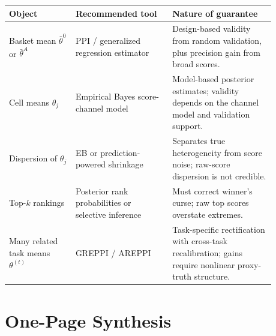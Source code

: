 \documentclass[11pt]{article}
\begin{document}
\begin{center}
\begin{tabular}{>{\raggedright\arraybackslash}p{0.22\linewidth}p{0.32\linewidth}p{0.34\linewidth}}
\toprule
Object & Recommended tool & Nature of guarantee \\
\midrule
Basket mean $\bar\theta^0$ or $\bar\theta^A$ & PPI / generalized regression estimator & Design-based validity from random validation, plus precision gain from broad scores. \\
Cell means $\theta_j$ & Empirical Bayes score-channel model & Model-based posterior estimates; validity depends on the channel model and validation support. \\
Dispersion of $\theta_j$ & EB or prediction-powered shrinkage & Separates true heterogeneity from score noise; raw-score dispersion is not credible. \\
Top-$k$ rankings & Posterior rank probabilities or selective inference & Must correct winner's curse; raw top scores overstate extremes. \\
Many related task means $\theta^{(t)}$ & GREPPI / AREPPI & Task-specific rectification with cross-task recalibration; gains require nonlinear proxy-truth structure. \\
\bottomrule
\end{tabular}
\end{center}

\section*{One-Page Synthesis}
\end{document}
